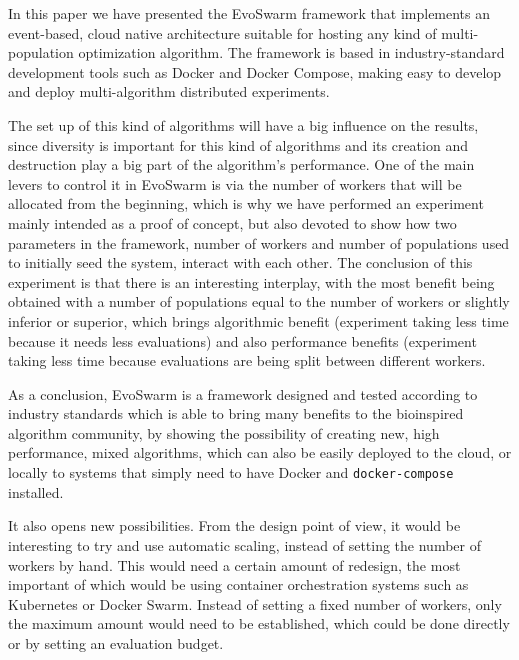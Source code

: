 \documentclass[review]{elsarticle}
\begin{document}
In this paper we have presented the EvoSwarm framework that implements
an event-based, cloud native architecture suitable for hosting any
kind of multi-population optimization algorithm. The framework is
based in industry-standard development tools such as Docker and Docker
Compose, making easy to develop and deploy multi-algorithm distributed
experiments.

The set up of this kind of algorithms will have a big influence on the
results, since diversity is important for this kind of algorithms and
its creation and destruction play a big part of the algorithm's
performance. One of the main levers to control it in EvoSwarm is via
the number of workers that will be allocated from the beginning, which
is why we have performed an experiment mainly intended as a proof of
concept, but also devoted to show how two parameters in the framework,
number of workers and number of populations used to initially seed the
system, interact with each other. The conclusion of this experiment is
that there is an interesting interplay, with the most benefit being
obtained with a number of populations equal to the number of workers
or slightly inferior or superior, which brings algorithmic benefit
(experiment taking less time because it needs less evaluations) and
also performance benefits (experiment taking less time because
evaluations are being split between different workers.

As a conclusion, EvoSwarm is a framework designed and tested according
to industry standards which is able to bring many benefits to the
bioinspired algorithm community, by showing the possibility of
creating new, high performance, mixed algorithms, which can also be
easily deployed to the cloud, or locally to systems that simply need
to have Docker and {\tt docker-compose} installed.

It also opens new possibilities. From the design point of view, it
would be interesting to try and use automatic scaling, instead of
setting the number of workers by hand. This would need a certain
amount of redesign, the most important of which would be using
container orchestration systems such as Kubernetes or Docker
Swarm. Instead of setting a fixed number of workers, only the maximum
amount would need to be established, which could be done directly or
by setting an evaluation budget.
\end{document}
